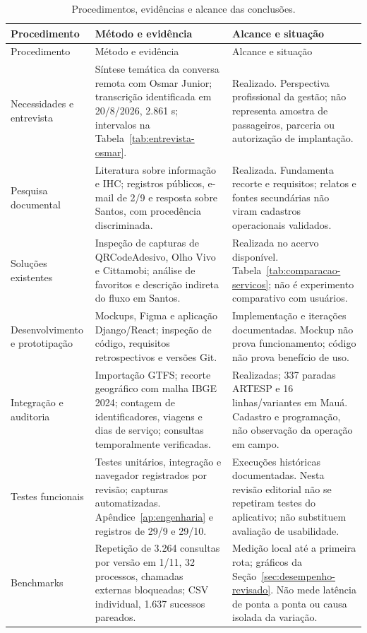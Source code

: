 \begin{longtable}{>{\raggedright\arraybackslash}p{2.6cm}p{5.7cm}p{6.4cm}}
\caption{Procedimentos, evidências e alcance das conclusões.}\label{tab:procedimentos-revisados}\\\hline
Procedimento & Método e evidência & Alcance e situação\\\hline\endfirsthead
\hline Procedimento & Método e evidência & Alcance e situação\\\hline\endhead
\hline\endfoot
Necessidades e entrevista & Síntese temática da conversa remota com Osmar Junior; transcrição identificada em 20/8/2026, 2.861 s; intervalos na Tabela~\ref{tab:entrevista-osmar}. & Realizado. Perspectiva profissional da gestão; não representa amostra de passageiros, parceria ou autorização de implantação.\\[5pt]
Pesquisa documental & Literatura sobre informação e IHC; registros públicos, e-mail de 2/9 e resposta sobre Santos, com procedência discriminada. & Realizada. Fundamenta recorte e requisitos; relatos e fontes secundárias não viram cadastros operacionais validados.\\[5pt]
Soluções existentes & Inspeção de capturas de QRCodeAdesivo, Olho Vivo e Cittamobi; análise de favoritos e descrição indireta do fluxo em Santos. & Realizada no acervo disponível. Tabela~\ref{tab:comparacao-servicos}; não é experimento comparativo com usuários.\\[5pt]
Desenvolvimento e prototipação & Mockups, Figma e aplicação Django/React; inspeção de código, requisitos retrospectivos e versões Git. & Implementação e iterações documentadas. Mockup não prova funcionamento; código não prova benefício de uso.\\[5pt]
Integração e auditoria & Importação GTFS; recorte geográfico com malha IBGE 2024; contagem de identificadores, viagens e dias de serviço; consultas temporalmente verificadas. & Realizadas; 337 paradas ARTESP e 16 linhas/variantes em Mauá. Cadastro e programação, não observação da operação em campo.\\[5pt]
Testes funcionais & Testes unitários, integração e navegador registrados por revisão; capturas automatizadas. Apêndice~\ref{ap:engenharia} e registros de 29/9 e 29/10. & Execuções históricas documentadas. Nesta revisão editorial não se repetiram testes do aplicativo; não substituem avaliação de usabilidade.\\[5pt]
Benchmarks & Repetição de 3.264 consultas por versão em 1/11, 32 processos, chamadas externas bloqueadas; CSV individual, 1.637 sucessos pareados. & Medição local até a primeira rota; gráficos da Seção~\ref{sec:desempenho-revisado}. Não mede latência de ponta a ponta ou causa isolada da variação.\\[5pt]

\end{longtable}
